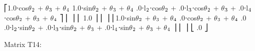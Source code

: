 \documentclass[letterpaper,10pt,english,openany,oneside]{sphinxmanual}
\begin{document}
\begin{sphinxVerbatim}[commandchars=\\\{\}]
⎡1.0⋅cos\(\theta\)\(\sb{\text{2}}\) + \(\theta\)\(\sb{\text{3}}\) + \(\theta\)\(\sb{\text{4}}\)  \PYGZhy{}1.0⋅sin\(\theta\)\(\sb{\text{2}}\) + \(\theta\)\(\sb{\text{3}}\) + \(\theta\)\(\sb{\text{4}}\)       .0⋅l\(\sb{\text{2}}\)⋅cos\(\theta\)\(\sb{\text{2}}\) + .0⋅l\(\sb{\text{3}}\)⋅cos\(\theta\)\(\sb{\text{2}}\) + \(\theta\)\(\sb{\text{3}}\) + .0⋅l\(\sb{\text{4}}\)⋅cos\(\theta\)\(\sb{\text{2}}\) + \(\theta\)\(\sb{\text{3}}\) + \(\theta\)\(\sb{\text{4}}\)    ⎤
⎢                                                                                                                    ⎥
⎢                                             \PYGZhy{}1.0                                                                ⎥
⎢                                                                                                                    ⎥
⎢1.0⋅sin\(\theta\)\(\sb{\text{2}}\) + \(\theta\)\(\sb{\text{3}}\) + \(\theta\)\(\sb{\text{4}}\)  .0⋅cos\(\theta\)\(\sb{\text{2}}\) + \(\theta\)\(\sb{\text{3}}\) + \(\theta\)\(\sb{\text{4}}\)   .0   .0⋅l\(\sb{\text{2}}\)⋅sin\(\theta\)\(\sb{\text{2}}\) + .0⋅l\(\sb{\text{3}}\)⋅sin\(\theta\)\(\sb{\text{2}}\) + \(\theta\)\(\sb{\text{3}}\) + .0⋅l\(\sb{\text{4}}\)⋅sin\(\theta\)\(\sb{\text{2}}\) + \(\theta\)\(\sb{\text{3}}\) + \(\theta\)\(\sb{\text{4}}\)    ⎥
⎢                                                                                                                    ⎥
⎣                                                                                .0                              ⎦


Matrix T\PYGZus{}1\PYGZus{}4:


\end{sphinxVerbatim}
\end{document}
